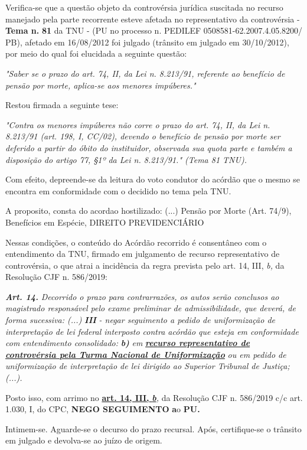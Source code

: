 \documentclass[12pt]{article}
\begin{document}
\justifying
\noindent Verifica-se que a questão objeto da controvérsia jurídica suscitada no recurso manejado pela parte recorrente esteve afetada no representativo da controvérsia - \textbf{Tema n. }\textbf{81} da TNU - (PU no processo n. PEDILEF 0508581-62.2007.4.05.8200/ PB),  afetado em 16/08/2012 foi julgado (trânsito em julgado em 30/10/2012), por meio do qual foi elucidada a seguinte questão:

\noindent \textit{"Saber se o prazo do art. 74, II, da Lei n. 8.213/91, referente ao benefício de pensão por morte, aplica-se aos menores impúberes."}

\noindent Restou firmada a seguinte tese:

\noindent \textit{"Contra os menores impúberes não corre o prazo do art. 74, II, da Lei n. 8.213/91 (art. 198, I, CC/02), devendo o benefício de pensão por morte ser deferido a partir do óbito do instituidor, observada sua quota parte e também a disposição do artigo 77, §1º da Lei n. 8.213/91." (Tema 81 TNU).}

\noindent Com efeito, depreende-se da leitura do voto condutor do acórdão que o mesmo se encontra em conformidade com o decidido no  tema pela TNU.

\noindent A proposito, consta do acordao hostilizado: (...) Pensão por Morte (Art. 74/9), Benefícios em Espécie, DIREITO PREVIDENCIÁRIO

\noindent Nessas condições, o conteúdo do Acórdão recorrido é consentâneo com o entendimento da TNU, firmado em julgamento de recurso representativo de controvérsia, o que atrai a incidência da regra prevista pelo art. 14, III, \textit{b,} da Resolução CJF n. 586/2019:

\noindent \textit{\textbf{Art. 14.}}\textit{ Decorrido o prazo para contrarrazões, os autos serão conclusos ao magistrado responsável pelo exame preliminar de admissibilidade, que deverá, de forma sucessiva: (...) }\textit{\textbf{III }}\textit{- negar seguimento a pedido de uniformização de interpretação de lei federal interposto contra acórdão que esteja em conformidade com entendimento consolidado: }\textit{\textbf{b)}}\textit{ em }\uline{\textit{\textbf{recurso representativo de controvérsia pela Turma Nacional de Uniformização}}}\textit{ ou em pedido de uniformização de interpretação de lei dirigido ao Superior Tribunal de Justiça;(...).}

\noindent Posto isso, com arrimo no \uline{\textbf{art. 14, III, }}\uline{\textit{\textbf{b}}}\textit{,} da Resolução CJF n. 586/2019 c/c art. 1.030, I, do CPC, \textbf{NEGO SEGUIMENTO }\textbf{a}o\textbf{ PU}\textbf{.}

\noindent Intimem-se. Aguarde-se o decurso do prazo recursal. Após, certifique-se o trânsito em julgado e devolva-se ao juízo de origem.
\end{document}
